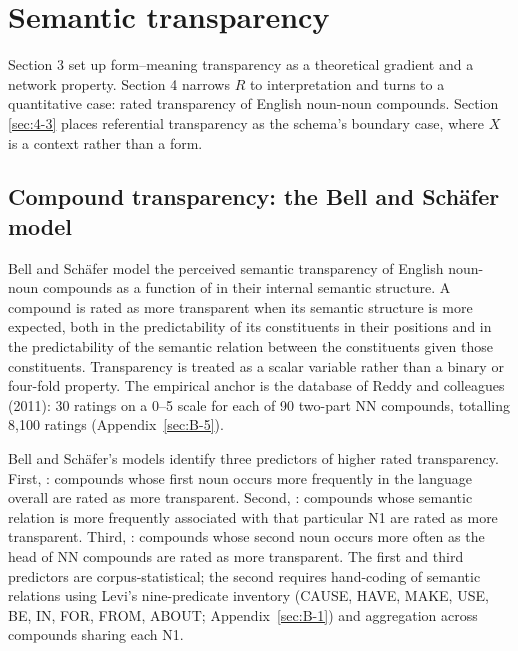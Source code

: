 \section{Semantic transparency}\label{sec:4}

Section 3 set up form--meaning transparency as a theoretical gradient and a network property. Section 4 narrows $R$ to interpretation and turns to a quantitative case: rated transparency of English noun-noun compounds. Section \ref{sec:4-3} places referential transparency as the schema's boundary case, where $X$ is a context rather than a form.

\subsection{Compound transparency: the Bell and Schäfer model}

Bell and Schäfer \autocite*{bell-schafer-2016-modelling-transparency} model the perceived semantic transparency of English noun-noun compounds as a function of  in their internal semantic structure. A compound is rated as more transparent when its semantic structure is more expected, both in the predictability of its constituents in their positions and in the predictability of the semantic relation between the constituents given those constituents. Transparency is treated as a scalar variable rather than a binary or four-fold property. The empirical anchor is the database of Reddy and colleagues (2011): 30 ratings on a 0--5 scale for each of 90 two-part NN compounds, totalling 8,100 ratings (Appendix~\ref{sec:B-5}).

Bell and Schäfer's models identify three predictors of higher rated transparency. First, : compounds whose first noun occurs more frequently in the language overall are rated as more transparent. Second, : compounds whose semantic relation is more frequently associated with that particular \textup{N1} are rated as more transparent. Third, : compounds whose second noun occurs more often as the head of NN compounds are rated as more transparent. The first and third predictors are corpus-statistical; the second requires hand-coding of semantic relations using Levi's \autocite*{levi-1978-complex-nominals} nine-predicate inventory (CAUSE, HAVE, MAKE, USE, BE, IN, FOR, FROM, ABOUT; Appendix~\ref{sec:B-1}) and aggregation across compounds sharing each \textup{N1}.

